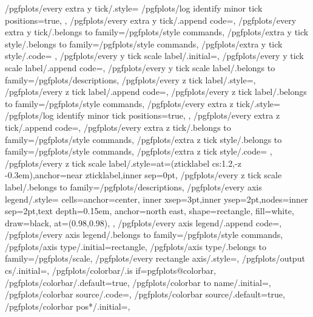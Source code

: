 {	/pgfplots/every extra y tick/.style={
		/pgfplots/log identify minor tick positions=true,
	},
	/pgfplots/every extra y tick/.append code={},
	/pgfplots/every extra y tick/.belongs to family=/pgfplots/style commands,
	/pgfplots/extra y tick style/.belongs to family=/pgfplots/style commands,
	/pgfplots/extra y tick style/.code={%
	},
	/pgfplots/every y tick scale label/.initial=,%
	/pgfplots/every y tick scale label/.append code={},
	/pgfplots/every y tick scale label/.belongs to family=/pgfplots/descriptions,
	/pgfplots/every z tick label/.style={},
	/pgfplots/every z tick label/.append code={},
	/pgfplots/every z tick label/.belongs to family=/pgfplots/style commands,
	/pgfplots/every extra z tick/.style={
		/pgfplots/log identify minor tick positions=true,
	},
	/pgfplots/every extra z tick/.append code={},
	/pgfplots/every extra z tick/.belongs to family=/pgfplots/style commands,
	/pgfplots/extra z tick style/.belongs to family=/pgfplots/style commands,
	/pgfplots/extra z tick style/.code={%
	},
	/pgfplots/every z tick scale label/.style={at={(zticklabel cs:1.2,-\pgfplotsvalueoflargesttickdimen z -0.3em)},anchor=near zticklabel,inner sep=0pt},
	/pgfplots/every z tick scale label/.belongs to family=/pgfplots/descriptions,
	/pgfplots/every axis legend/.style={%
		cells={anchor=center},
		inner xsep=3pt,inner ysep=2pt,nodes={inner sep=2pt,text depth=0.15em},
		anchor=north east,%
		shape=rectangle,%
		fill=white,%
		draw=black,
		at={(0.98,0.98)},
	},
	/pgfplots/every axis legend/.append code={},
	/pgfplots/every axis legend/.belongs to family=/pgfplots/style commands,
	/pgfplots/axis type/.initial=rectangle,
	/pgfplots/axis type/.belongs to family=/pgfplots/scale,
	/pgfplots/every rectangle axis/.style={},
	/pgfplots/output cs/.initial=,
	/pgfplots/colorbar/.is if=pgfplots@colorbar,
	/pgfplots/colorbar/.default=true,
	/pgfplots/colorbar to name/.initial=,
	/pgfplots/colorbar source/.code={},
	/pgfplots/colorbar source/.default=true,
	/pgfplots/colorbar pos*/.initial=,%
}
